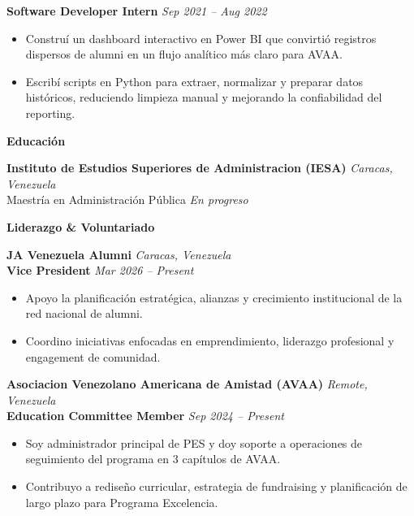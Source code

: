 \documentclass[11pt]{article}
\begin{document}
\textbf{Software Developer Intern} \hfill \textit{Sep 2021 -- Aug 2022}
\begin{itemize}
    \item Construí un dashboard interactivo en Power BI que convirtió registros dispersos de alumni en un flujo analítico más claro para AVAA.
    \item Escribí scripts en Python para extraer, normalizar y preparar datos históricos, reduciendo limpieza manual y mejorando la confiabilidad del reporting.
\end{itemize}
\vspace{8pt}
\begin{center}
    \textbf{Educación}
\end{center}
\vspace{-4pt}
\textbf{Instituto de Estudios Superiores de Administracion (IESA)} \hfill \textit{Caracas, Venezuela} \\
Maestría en Administración Pública \hfill \textit{En progreso}
\vspace{8pt}
\begin{center}
    \textbf{Liderazgo \& Voluntariado}
\end{center}
\vspace{-4pt}
\textbf{JA Venezuela Alumni} \hfill \textit{Caracas, Venezuela} \\
\textbf{Vice President} \hfill \textit{Mar 2026 -- Present}
\begin{itemize}
    \item Apoyo la planificación estratégica, alianzas y crecimiento institucional de la red nacional de alumni.
    \item Coordino iniciativas enfocadas en emprendimiento, liderazgo profesional y engagement de comunidad.
\end{itemize}
\vspace{10pt}
\textbf{Asociacion Venezolano Americana de Amistad (AVAA)} \hfill \textit{Remote, Venezuela} \\
\textbf{Education Committee Member} \hfill \textit{Sep 2024 -- Present}
\begin{itemize}
    \item Soy administrador principal de PES y doy soporte a operaciones de seguimiento del programa en 3 capítulos de AVAA.
    \item Contribuyo a rediseño curricular, estrategia de fundraising y planificación de largo plazo para Programa Excelencia.
\end{itemize}
\vspace{10pt}
\end{document}
